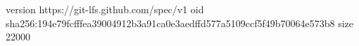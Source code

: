 version https://git-lfs.github.com/spec/v1
oid sha256:194e79fcfffea39004912b3a91ca0e3aedffd577a5109ccf5f49b70064e573b8
size 22000
